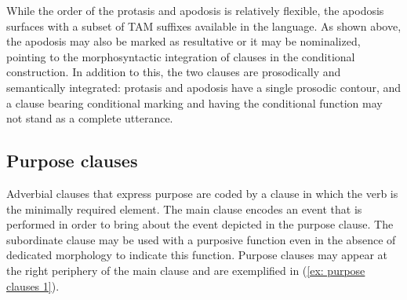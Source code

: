 While the order of the protasis and apodosis is relatively flexible, the apodosis surfaces with a subset of TAM suffixes available in the language. As shown above, the apodosis may also be marked as resultative or it may be nominalized, pointing to the morphosyntactic integration of clauses in the conditional construction. In addition to this, the two clauses are prosodically and semantically integrated: protasis and apodosis have a single prosodic contour, and a clause bearing conditional marking and having the conditional function may not stand as a complete utterance.

\subsection{Purpose clauses}
\label{subsec: purpose clauses}

Adverbial clauses that express purpose are coded by a clause in which the verb is the minimally required element. The main clause encodes an event that is performed in order to bring about the event depicted in the purpose clause. The subordinate clause may be used with a purposive function even in the absence of dedicated morphology to indicate this function. Purpose clauses may appear at the right periphery of the main clause and are exemplified in (\ref{ex: purpose clauses 1}).

\ea\label{ex: purpose clauses 1}

